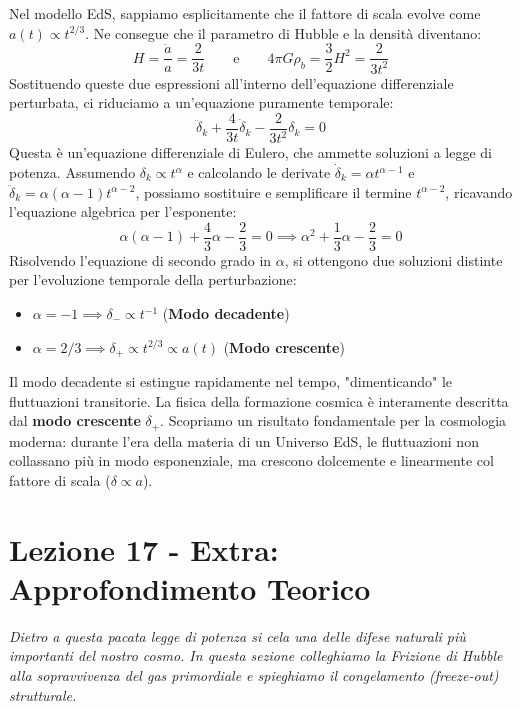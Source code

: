 \documentclass[11pt,a4paper]{report}
\begin{document}
Nel modello EdS, sappiamo esplicitamente che il fattore di scala evolve come $a(t) \propto t^{2/3}$. Ne consegue che il parametro di Hubble e la densità diventano:
\begin{equation}
H = \frac{\dot{a}}{a} = \frac{2}{3t} \qquad \text{e} \qquad 4\pi G \rho_b = \frac{3}{2}H^2 = \frac{2}{3t^2}
\end{equation}
Sostituendo queste due espressioni all'interno dell'equazione differenziale perturbata, ci riduciamo a un'equazione puramente temporale:
\begin{equation}
\ddot{\delta}_k + \frac{4}{3t}\dot{\delta}_k - \frac{2}{3t^2}\delta_k = 0
\end{equation}
Questa è un'equazione differenziale di Eulero, che ammette soluzioni a legge di potenza. Assumendo $\delta_k \propto t^\alpha$ e calcolando le derivate $\dot{\delta}_k = \alpha t^{\alpha-1}$ e $\ddot{\delta}_k = \alpha(\alpha-1)t^{\alpha-2}$, possiamo sostituire e semplificare il termine $t^{\alpha-2}$, ricavando l'equazione algebrica per l'esponente:
\begin{equation}
\alpha(\alpha-1) + \frac{4}{3}\alpha - \frac{2}{3} = 0 \implies \alpha^2 + \frac{1}{3}\alpha - \frac{2}{3} = 0
\end{equation}
Risolvendo l'equazione di secondo grado in $\alpha$, si ottengono due soluzioni distinte per l'evoluzione temporale della perturbazione:
\begin{itemize}
    \item $\alpha = -1 \implies \delta_- \propto t^{-1}$ (\textbf{Modo decadente})
    \item $\alpha = 2/3 \implies \delta_+ \propto t^{2/3} \propto a(t)$ (\textbf{Modo crescente})
\end{itemize}
Il modo decadente si estingue rapidamente nel tempo, "dimenticando" le fluttuazioni transitorie. La fisica della formazione cosmica è interamente descritta dal \textbf{modo crescente} $\delta_+$. Scopriamo un risultato fondamentale per la cosmologia moderna: durante l'era della materia di un Universo EdS, le fluttuazioni non collassano più in modo esponenziale, ma crescono dolcemente e linearmente col fattore di scala ($\delta \propto a$).

\newpage
\section{Lezione 17 - Extra: Approfondimento Teorico}

\textit{Dietro a questa pacata legge di potenza si cela una delle difese naturali più importanti del nostro cosmo. In questa sezione colleghiamo la Frizione di Hubble alla sopravvivenza del gas primordiale e spieghiamo il congelamento (freeze-out) strutturale.}
\end{document}
